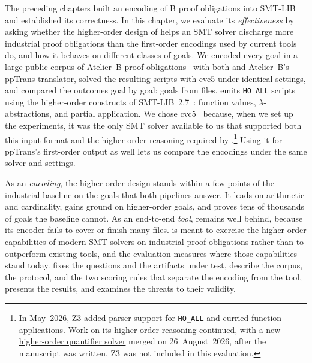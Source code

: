 \label{ch:evaluation}

The preceding chapters built an encoding of B proof obligations into SMT-LIB and established its correctness.
In this chapter, we evaluate its \emph{effectiveness} by asking whether the higher-order design of  helps an SMT solver discharge more industrial proof obligations than the first-order encodings used by current tools do, and how it behaves on different classes of goals.
We encoded every goal in a large public corpus of Atelier~B proof obligations~\cite{deharbe2022pog} with both \beer{} and Atelier~B's ppTrans translator, solved the resulting scripts with cvc5 under identical settings, and compared the outcomes goal by goal: \bmGoals{} goals from \bmFiles{} files.
\beer{} emits \texttt{HO\_ALL} scripts using the higher-order constructs of SMT-LIB~2.7~\cite{smtlib2.7}: function values, \(\lambda\)-abstractions, and partial application.
We chose cvc5~\cite{barbosa2022cvc5,barbosa2019hosmt} because, when we set up the experiments, it was the only SMT solver available to us that supported both this input format and the higher-order reasoning required by \beer{}.\footnote{In May~2026, Z3 \href{https://github.com/Z3Prover/z3/pull/9636}{added parser support} for \texttt{HO\_ALL} and curried function applications. Work on its higher-order reasoning continued, with a \href{https://github.com/Z3Prover/z3/pull/10639}{new higher-order quantifier solver} merged on 26~August~2026, after the manuscript was written. Z3 was not included in this evaluation.}
Using it for ppTrans's first-order output as well lets us compare the encodings under the same solver and settings.

As an \emph{encoding}, the higher-order design stands within a few points of the industrial baseline on the goals that both pipelines answer.
It leads on arithmetic and cardinality, gains ground on higher-order goals, and proves tens of thousands of goals the baseline cannot.
As an end-to-end \emph{tool}, \beer{} remains well behind, because its encoder fails to cover or finish many files.
\beer{} is meant to exercise the higher-order capabilities of modern SMT solvers on industrial proof obligations rather than to outperform existing tools, and the evaluation measures where those capabilities stand today.
 fixes the questions and the artifacts under test,  describe the corpus, the protocol, and the two scoring rules that separate the encoding from the tool,  presents the results, and  examines the threats to their validity.







